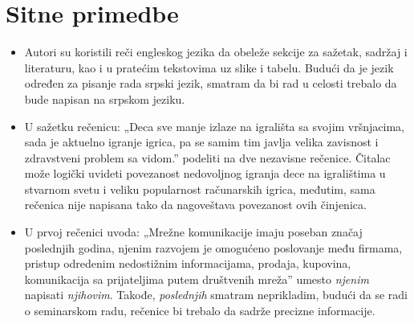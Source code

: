 \documentclass[a4paper]{report}
\begin{document}
\section{Sitne primedbe}
\begin{itemize}
    \item Autori su koristili reči engleskog jezika da obeleže sekcije za sažetak, sadržaj i literaturu, kao i u pratećim tekstovima uz slike i tabelu. Budući da je jezik određen za pisanje rada srpski jezik, smatram da bi rad u celosti trebalo da bude napisan na srpskom jeziku. 
\end{itemize}
\begin{itemize}
    \item U sažetku rečenicu: \newline
    „Deca sve manje izlaze na igrališta sa svojim vršnjacima, sada je aktuelno igranje igrica, pa se samim tim javlja velika zavisnost i zdravstveni problem sa vidom.”\newline
    podeliti na dve nezavisne rečenice. Čitalac može logički uvideti povezanost nedovoljnog igranja dece na igralištima u stvarnom svetu i veliku popularnost računarskih igrica, međutim, sama rečenica nije napisana tako da nagoveštava povezanost ovih činjenica. 
\end{itemize}
\begin{itemize}
    \item U prvoj rečenici uvoda:\newline
    „Mrežne komunikacije imaju poseban značaj poslednjih godina, njenim razvojem je omogućeno poslovanje među firmama, pristup odredenim nedostižnim informacijama, prodaja, kupovina, komunikacija sa prijateljima putem društvenih mreža”\newline
    umesto \textit{njenim} napisati \textit{njihovim}. Takođe, \textit{poslednjih} smatram neprikladim, budući da se radi o seminarskom radu, rečenice bi trebalo da sadrže precizne informacije. 
\end{itemize}
\end{document}
